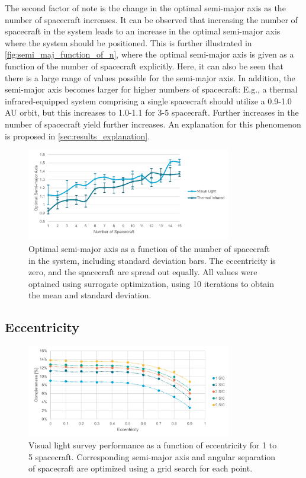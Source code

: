 The second factor of note is the change in the optimal semi-major axis as the number of spacecraft increases. It can be observed that increasing the number of spacecraft in the system leads to an increase in the optimal semi-major axis where the system should be positioned. This is further illustrated in \autoref{fig:semi_maj_function_of_n}, where the optimal semi-major axis is given as a function of the number of spacecraft explicitly. Here, it can also be seen that there is a large range of values possible for the semi-major axis. In addition, the semi-major axis becomes larger for higher numbers of spacecraft: E.g., a thermal infrared-equipped system comprising a single spacecraft should utilize a 0.9-1.0 AU orbit, but this increases to 1.0-1.1 for 3-5 spacecraft. Further increases in the number of spacecraft yield further increases. An explanation for this phenomenon is proposed in \autoref{sec:results_explanation}.

\begin{figure}[htbp]
 \centering
 \includegraphics[width=0.8\textwidth]{img/semi_maj_function_of_n.pdf}
 \caption{Optimal semi-major axis as a function of the number of spacecraft in the system, including standard deviation bars. The eccentricity is zero, and the spacecraft are spread out equally. All values were optained using surrogate optimization, using 10 iterations to obtain the mean and standard deviation.}
 \label{fig:semi_maj_function_of_n}
\end{figure}



\subsection{Eccentricity}
\begin{figure}[htbp]
 \centering
 \includegraphics[width=0.8\textwidth]{img/vis_ecc.pdf}
 \caption{Visual light survey performance as a function of eccentricity for 1 to 5 spacecraft. Corresponding semi-major axis and angular separation of spacecraft are optimized using a grid search for each point.}
 \label{fig:vis_ecc}
\end{figure}

